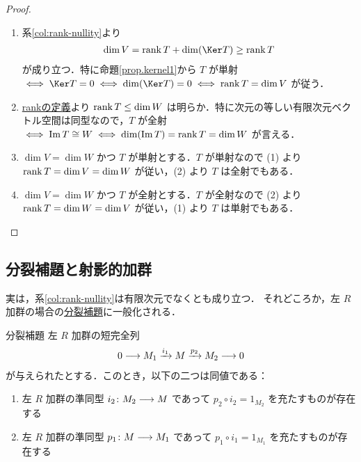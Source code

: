 \documentclass[geometry_main]{subfiles}
\begin{document}
\begin{proof}
	\begin{enumerate}
		\item 系\ref{col:rank-nullity}より
		\begin{align}
			\dim V = \rank T + \dim (\Ker T) \ge \rank T
		\end{align}
		が成り立つ．特に命題\ref{prop.kernel1}から $T$ が単射 $\iff \Ker T = 0 \iff \dim (\Ker T) = 0 \iff \rank T = \dim V$ が従う．
		\item \hyperref[def:rank]{rankの定義}より $\rank T \le \dim W$ は明らか．特に次元の等しい有限次元ベクトル空間は同型なので，$T$ が全射 $\iff \Im T \cong W \iff \dim (\Im T) = \rank T = \dim W$ が言える．
		\item $\dim V = \dim W$ かつ $T$ が単射とする．$T$ が単射なので (1) より $\rank T = \dim V = \dim W$ が従い，(2) より $T$ は全射でもある．
		\item $\dim V = \dim W$ かつ $T$ が全射とする．$T$ が全射なので (2) より $\rank T = \dim W = \dim V$ が従い，(1) より $T$ は単射でもある．
	\end{enumerate}
\end{proof}

\subsection{分裂補題と射影的加群}


実は，系\ref{col:rank-nullity}は有限次元でなくとも成り立つ．
それどころか，左 $R$ 加群の場合の\hyperref[lem:splitting]{分裂補題}に一般化される．

\begin{mylem}[label=lem:splitting]{分裂補題}
    左 $R$ 加群の短完全列
    \begin{align}
        \label{SES:3-1}
        0 \longrightarrow M_1 \xrightarrow{i_1} M \xrightarrow{p_2} M_2 \longrightarrow 0
    \end{align}
    が与えられたとする．このとき，以下の二つは同値である：
    \begin{enumerate}
        \item 左 $R$ 加群の準同型 $i_2 \colon M_2 \longrightarrow M$ であって $p_2 \circ i_2 = 1_{M_2}$ を充たすものが存在する
        \item 左 $R$ 加群の準同型 $p_1 \colon M \longrightarrow M_1$ であって $p_1 \circ i_1 = 1_{M_1}$ を充たすものが存在する
    \end{enumerate}
\end{mylem}
\end{document}
